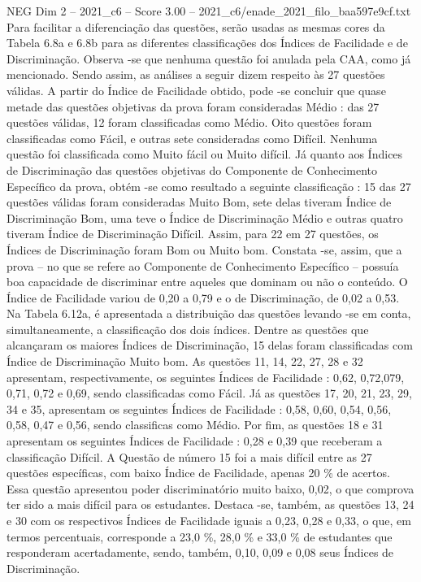\begin{textsample}{NEG Dim 2 – 2021\_c6 – Score 3.00 – 2021\_c6/enade\_2021\_filo\_baa597e9cf.txt}
Para facilitar a diferenciação das questões, serão usadas as mesmas cores da Tabela 6.8a e 6.8b para as diferentes classificações dos Índices de Facilidade e de Discriminação.
Observa -se que nenhuma questão foi anulada pela CAA, como já mencionado.
Sendo assim, as análises a seguir dizem respeito às 27 questões válidas.
A partir do Índice de Facilidade obtido, pode -se concluir que quase metade das questões objetivas da prova foram consideradas Médio : das 27 questões válidas, 12 foram classificadas como Médio.
Oito questões foram classificadas como Fácil, e outras sete consideradas como Difícil.
Nenhuma questão foi classificada como Muito fácil ou Muito difícil.
Já quanto aos Índices de Discriminação das questões objetivas do Componente de Conhecimento Específico da prova, obtém -se como resultado a seguinte classificação : 15 das 27 questões válidas foram consideradas Muito Bom, sete delas tiveram Índice de Discriminação Bom, uma teve o Índice de Discriminação Médio e outras quatro tiveram Índice de Discriminação Difícil.
Assim, para 22 em 27 questões, os Índices de Discriminação foram Bom ou Muito bom.
Constata -se, assim, que a prova – no que se refere ao Componente de Conhecimento Específico – possuía boa capacidade de discriminar entre aqueles que dominam ou não o conteúdo.
O Índice de Facilidade variou de 0,20 a 0,79 e o de Discriminação, de 0,02 a 0,53.
Na Tabela 6.12a, é apresentada a distribuição das questões levando -se em conta, simultaneamente, a classificação dos dois índices.
Dentre as questões que alcançaram os maiores Índices de Discriminação, 15 delas foram classificadas com Índice de Discriminação Muito bom.
As questões 11, 14, 22, 27, 28 e 32 apresentam, respectivamente, os seguintes Índices de Facilidade : 0,62, 0,72,079, 0,71, 0,72 e 0,69, sendo classificadas como Fácil.
Já as questões 17, 20, 21, 23, 29, 34 e 35, apresentam os seguintes Índices de Facilidade : 0,58, 0,60, 0,54, 0,56, 0,58, 0,47 e 0,56, sendo classificas como Médio.
Por fim, as questões 18 e 31 apresentam os seguintes Índices de Facilidade : 0,28 e 0,39 que receberam a classificação Difícil.
A Questão de número 15 foi a mais difícil entre as 27 questões específicas, com baixo Índice de Facilidade, apenas 20 \% de acertos.
Essa questão apresentou poder discriminatório muito baixo, 0,02, o que comprova ter sido a mais difícil para os estudantes.
Destaca -se, também, as questões 13, 24 e 30 com os respectivos Índices de Facilidade iguais a 0,23, 0,28 e 0,33, o que, em termos percentuais, corresponde a 23,0 \%, 28,0 \% e 33,0 \% de estudantes que responderam acertadamente, sendo, também, 0,10, 0,09 e 0,08 seus Índices de Discriminação.

\end{textsample}
